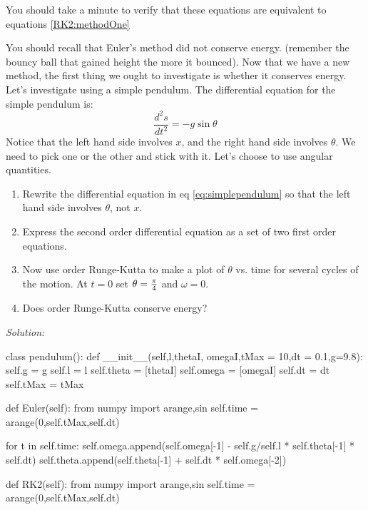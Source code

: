 You should take a minute to verify that these equations are equivalent
to equations \eqref{RK2:methodOne}

\begin{enumerate}
  \probtwo You should
  recall that Euler's method did not conserve energy. (remember the
  bouncy ball that gained height the more it bounced).  Now that we
  have a new method, the first thing we ought to investigate is whether
  it conserves energy.  Let's investigate using a simple pendulum.
  The differential equation for the simple pendulum is:
\begin{equation}\label{eq:simplependulum}
\frac{d^2s}{dt^2} = -g \sin \theta
\end{equation}
Notice that the left hand side involves $x$, and the right hand side
involves $\theta$.  We need to pick one or the other and stick with
it. Let's choose to use angular quantities.
\begin{enumerate}
\item Rewrite the differential equation in eq \eqref{eq:simplependulum}
  so that the left hand side involves $\theta$, not $x$.
\item Express the second order differential equation as a set of two
  first order equations.
\item Now use  order Runge-Kutta to make a plot of $\theta$
  vs. time for several cycles of the motion.  At $t=0$ set $\theta =
  {\pi \over 4}$ and $\omega = 0$.
\item Does  order Runge-Kutta conserve energy?
\end{enumerate}
\ifsolutions
\textit{Solution:}\\
\begin{codeexample}
\begin{VerbatimOut}{\listingFile}
class pendulum():
    def __init__(self,l,thetaI, omegaI,tMax = 10,dt = 0.1,g=9.8):
        self.g = g
        self.l = l
        self.theta = [thetaI]
        self.omega = [omegaI]
        self.dt = dt
        self.tMax = tMax


    def Euler(self):
        from numpy import arange,sin
        self.time = arange(0,self.tMax,self.dt)

        for t in self.time:
            self.omega.append(self.omega[-1] - self.g/self.l * self.theta[-1] * self.dt)
            self.theta.append(self.theta[-1] + self.dt * self.omega[-2])
    
    def RK2(self):
        from numpy import arange,sin
        self.time = arange(0,self.tMax,self.dt)


\end{VerbatimOut}
\end{codeexample}
\end{enumerate}

